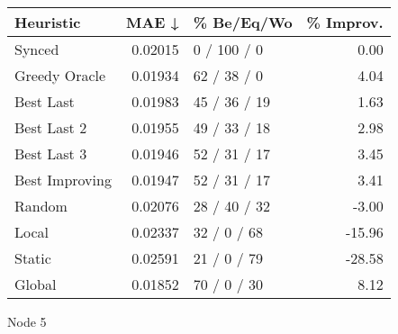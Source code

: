 \begin{tabular}{lrlr}
\toprule
\textbf{Heuristic} & \textbf{MAE ↓} & \textbf{\% Be/Eq/Wo} & \textbf{\% Improv.} \\
\midrule
            Synced &        0.02015 &          0 / 100 / 0 &                0.00 \\
     Greedy Oracle &        0.01934 &          62 / 38 / 0 &                4.04 \\
         Best Last &        0.01983 &         45 / 36 / 19 &                1.63 \\
       Best Last 2 &        0.01955 &         49 / 33 / 18 &                2.98 \\
       Best Last 3 &        0.01946 &         52 / 31 / 17 &                3.45 \\
    Best Improving &        0.01947 &         52 / 31 / 17 &                3.41 \\
            Random &        0.02076 &         28 / 40 / 32 &               -3.00 \\
             Local &        0.02337 &          32 / 0 / 68 &              -15.96 \\
            Static &        0.02591 &          21 / 0 / 79 &              -28.58 \\
            Global &        0.01852 &          70 / 0 / 30 &                8.12 \\
\bottomrule
\end{tabular}
\caption{Node 5}
\label{tab:iid_lr05_le2_bs2_5}
